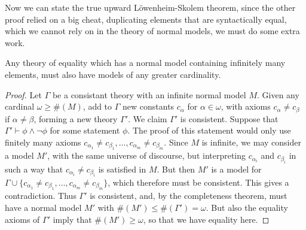 Now we can state the true upward L\"{o}wenheim-Skolem theorem, since the other proof relied on a big cheat, duplicating elements that are syntactically equal, which we cannot rely on in the theory of normal models, we must do some extra work.

\begin{corollary}
    Any theory of equality which has a normal model containing infinitely many elements, must also have models of any greater cardinality.
\end{corollary}
\begin{proof}
    Let $\Gamma$ be a consistant theory with an infinite normal model $M$. Given any cardinal $\omega \geq \#(M)$, add to $\Gamma$ new constants $c_\alpha$ for $\alpha \in \omega$, with axioms $c_\alpha \neq c_\beta$ if $\alpha \neq \beta$, forming a new theory $\Gamma'$. We claim $\Gamma'$ is consistent. Suppose that $\Gamma' \vdash \phi \wedge \neg \phi$ for some statement $\phi$. The proof of this statement would only use finitely many axioms $c_{\alpha_1} \neq c_{\beta_1}, \dots, c_{\alpha_m} \neq c_{\beta_m}$. Since $M$ is infinite, we may consider a model $M'$, with the same universe of discourse, but interpreting $c_{\alpha_i}$ and $c_{\beta_i}$ in such a way that $c_{\alpha_i} \neq c_{\beta_i}$ is satisfied in $M$. But then $M'$ is a model for $\Gamma \cup \{ c_{\alpha_1} \neq c_{\beta_1}, \dots, c_{\alpha_m} \neq c_{\beta_m} \}$, which therefore must be consistent. This gives a contradiction. Thus $\Gamma'$ is consistent, and, by the completeness theorem, must have a normal model $M'$ with $\#(M') \leq \#(\Gamma') = \omega$. But also the equality axioms of $\Gamma'$ imply that $\#(M') \geq \omega$, so that we have equality here.
\end{proof}


